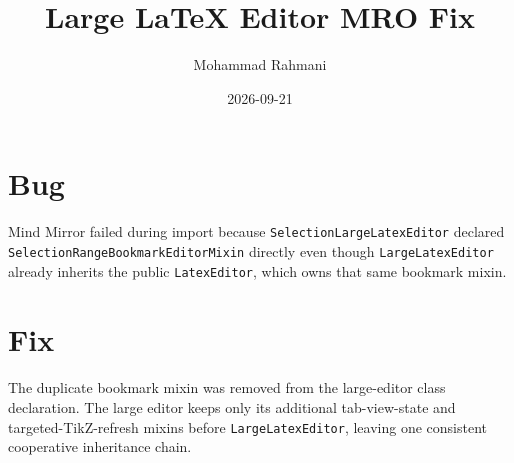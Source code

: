 \documentclass[a4paper]{article}
\title{Large LaTeX Editor MRO Fix}
\date{2026-09-21}
\author{Mohammad Rahmani}
\begin{document}
   \maketitle

   \begin{preview}
      \section{Bug}
      Mind Mirror failed during import because
      \texttt{SelectionLargeLatexEditor} declared
      \texttt{SelectionRangeBookmarkEditorMixin} directly even though
      \texttt{LargeLatexEditor} already inherits the public
      \texttt{LatexEditor}, which owns that same bookmark mixin.

      \section{Fix}
      The duplicate bookmark mixin was removed from the large-editor class
      declaration. The large editor keeps only its additional tab-view-state
      and targeted-TikZ-refresh mixins before \texttt{LargeLatexEditor}, leaving
      one consistent cooperative inheritance chain.
   \end{preview}

   
   
\end{document}
